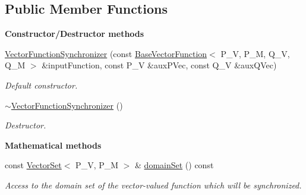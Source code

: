 \subsection*{Public Member Functions}
\begin{Indent}{\bf Constructor/\-Destructor methods}\par
\begin{DoxyCompactItemize}
\item 
\hyperlink{class_q_u_e_s_o_1_1_vector_function_synchronizer_a6ca588264a0c67e89a272d84099d8ec4}{Vector\-Function\-Synchronizer} (const \hyperlink{class_q_u_e_s_o_1_1_base_vector_function}{Base\-Vector\-Function}$<$ P\-\_\-\-V, P\-\_\-\-M, Q\-\_\-\-V, Q\-\_\-\-M $>$ \&input\-Function, const P\-\_\-\-V \&aux\-P\-Vec, const Q\-\_\-\-V \&aux\-Q\-Vec)
\begin{DoxyCompactList}\small\item\em Default constructor. \end{DoxyCompactList}\item 
\hyperlink{class_q_u_e_s_o_1_1_vector_function_synchronizer_af36b7e764244331c8b64ac53a16f5d6d}{$\sim$\-Vector\-Function\-Synchronizer} ()
\begin{DoxyCompactList}\small\item\em Destructor. \end{DoxyCompactList}\end{DoxyCompactItemize}
\end{Indent}
\begin{Indent}{\bf Mathematical methods}\par
\begin{DoxyCompactItemize}
\item 
const \hyperlink{class_q_u_e_s_o_1_1_vector_set}{Vector\-Set}$<$ P\-\_\-\-V, P\-\_\-\-M $>$ \& \hyperlink{class_q_u_e_s_o_1_1_vector_function_synchronizer_a221738d8cac4be1e0516489d1520f92e}{domain\-Set} () const 
\begin{DoxyCompactList}\small\item\em Access to the domain set of the vector-\/valued function which will be synchronized. \end{DoxyCompactList}\end{DoxyCompactItemize}
\end{Indent}
